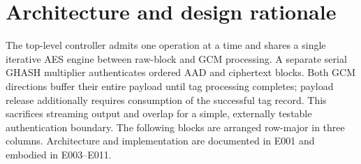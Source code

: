 \documentclass[11pt,a4paper]{article}
\begin{document}
\section{Architecture and design rationale}

The top-level controller admits one operation at a time and shares a single iterative AES engine between raw-block and GCM processing. A separate serial GHASH multiplier authenticates ordered AAD and ciphertext blocks. Both GCM directions buffer their entire payload until tag processing completes; payload release additionally requires consumption of the successful tag record. This sacrifices streaming output and overlap for a simple,\allowbreak{} externally testable authentication boundary. The following blocks are arranged row-major in three columns. Architecture and implementation are documented in E001 and embodied in E003–E011.
\end{document}
